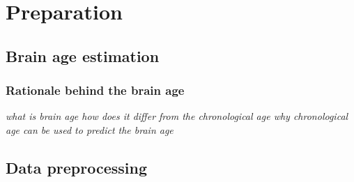 \chapter{Preparation}

\section{Brain age estimation}
\subsection{Rationale behind the brain age}
\textit{what is brain age how does it differ from the chronological age why chronological age can be used to predict the brain age}

\section{Data preprocessing}



